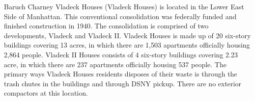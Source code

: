 Baruch Charney Vladeck Houses (Vladeck Houses) is located in the Lower East Side of Manhattan. This conventional consolidation was federally funded and finished construction in 1940. The consolidation is comprised of two developments, Vladeck and Vladeck II. Vladeck Houses is made up of 20 six-story buildings covering 13 acres, in which there are 1,503 apartments officially housing 2,864 people. Vladeck II Houses consists of 4 six-story buildings covering 2.23 acre, in which there are 237 apartments officially housing 537 people. The primary ways Vladeck Houses residents disposes of their waste is through the trash chutes in the buildings and through DSNY pickup. There are no exterior compactors at this location.